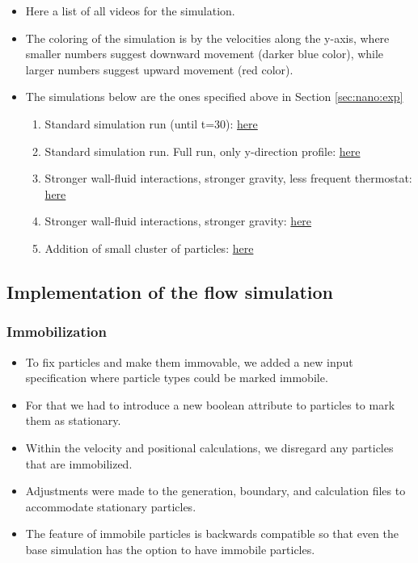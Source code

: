 \documentclass{article}
\begin{document}
    \begin{itemize}
        \item Here a list of all videos for the simulation.
        \item The coloring of the simulation is by the velocities along the y-axis, where smaller numbers suggest downward movement (darker blue color), while larger numbers suggest upward movement (red color).
        \item The simulations below are the ones specified above in Section \ref{sec:nano:exp}
        \begin{enumerate}
            \item Standard simulation run (until t=30): \href{https://youtu.be/-eWISjhgIgA}{here}
            \item Standard simulation run. Full run, only y-direction profile: \href{https://www.youtube.com/watch?v=0xr62UzcphU}{here}
            \item Stronger wall-fluid interactions, stronger gravity, less frequent thermostat: \href{https://www.youtube.com/watch?v=yxNYmXJg5r0}{here}
            \item Stronger wall-fluid interactions, stronger gravity: \href{https://www.youtube.com/watch?v=I4h6tjnJVuI}{here}
            \item Addition of small cluster of particles: \href{https://www.youtube.com/watch?v=G34H3SCnpW0}{here}
        \end{enumerate}
    \end{itemize}

\subsection{Implementation of the flow simulation}
\label{sec:nano:impl}

    \subsubsection{Immobilization}
    \label{sec:nano:impl:immob}
        \begin{itemize}
            \item To fix particles and make them immovable, we added a new input specification where particle types could be marked immobile.
            \item For that we had to introduce a new boolean attribute to particles to mark them as stationary.
            \item Within the velocity and positional calculations, we disregard any particles that are immobilized.
            \item Adjustments were made to the generation, boundary, and calculation files to accommodate stationary particles.
            \item The feature of immobile particles is backwards compatible so that even the base simulation has the option to have immobile particles.
        \end{itemize}
\end{document}
